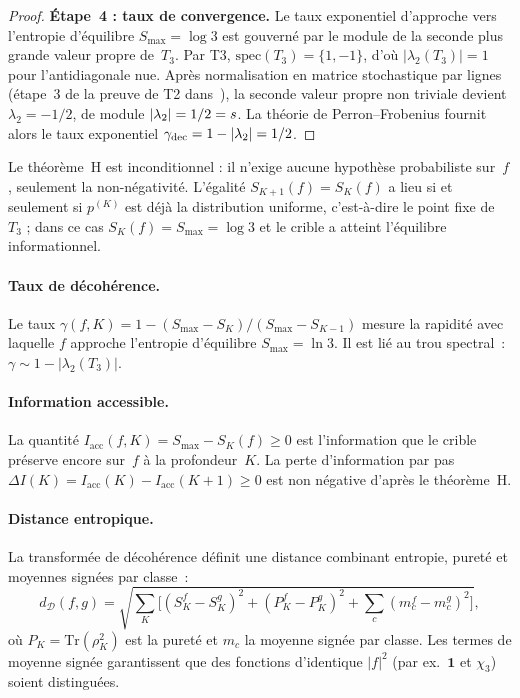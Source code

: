 \documentclass[12pt,a4paper]{article}
\begin{document}
\begin{proof}
\textbf{Étape~4 : taux de convergence.}
Le taux exponentiel d'approche vers l'entropie d'équilibre
$S_{\max} = \log 3$ est gouverné par le module de la seconde plus
grande valeur propre de~$T_3$. Par T3, $\mathrm{spec}(T_3) =
\{1, -1\}$, d'où $|\lambda_2(T_3)| = 1$ pour l'antidiagonale nue.
Après normalisation en matrice stochastique par lignes
(étape~3 de la preuve de T2 dans~\cite{companion_M3}), la
seconde valeur propre non triviale devient $\lambda_2 = -1/2$, de
module $|\lambda_2| = 1/2 = s$. La théorie de
Perron--Frobenius fournit alors le taux exponentiel
$\gamma_{\rm dec} = 1 - |\lambda_2| = 1/2$.
\end{proof}

\begin{remarque}
Le théorème~H est inconditionnel : il n'exige aucune hypothèse
probabiliste sur~$f$, seulement la non-négativité. L'égalité
$S_{K+1}(f) = S_K(f)$ a lieu si et seulement si $p^{(K)}$ est déjà
la distribution uniforme, c'est-à-dire le point fixe de~$T_3$ ;
dans ce cas $S_K(f) = S_{\max} = \log 3$ et le crible a atteint
l'équilibre informationnel.
\end{remarque}

\paragraph{Taux de décohérence.}
Le taux $\gamma(f,K) = 1 - (S_{\max} - S_K)/(S_{\max} - S_{K-1})$
mesure la rapidité avec laquelle $f$ approche l'entropie d'équilibre
$S_{\max} = \ln 3$. Il est lié au trou spectral~:
$\gamma \sim 1 - |\lambda_2(T_3)|$.

\paragraph{Information accessible.}
La quantité $I_{\mathrm{acc}}(f,K) = S_{\max} - S_K(f) \geq 0$ est
l'information que le crible préserve encore sur~$f$ à la
profondeur~$K$. La perte d'information par pas
$\Delta I(K) = I_{\mathrm{acc}}(K) - I_{\mathrm{acc}}(K+1) \geq 0$
est non négative d'après le théorème~H.

\paragraph{Distance entropique.}
La transformée de décohérence définit une distance combinant
entropie, pureté et moyennes signées par classe~:
\begin{equation}
  d_{\mathcal{D}}(f,g)
  = \sqrt{\sum_K \bigl[
    (S_K^f - S_K^g)^2 + (P_K^f - P_K^g)^2
    + \textstyle\sum_c (m_c^f - m_c^g)^2
  \bigr]},
  \label{eq:decoherence_distance}
\end{equation}
où $P_K = \mathrm{Tr}(\rho_K^2)$ est la pureté et $m_c$ la moyenne
signée par classe. Les termes de moyenne signée garantissent que des
fonctions d'identique $|f|^2$ (par ex.\ $\mathbf{1}$ et $\chi_3$)
soient distinguées.
\end{document}
